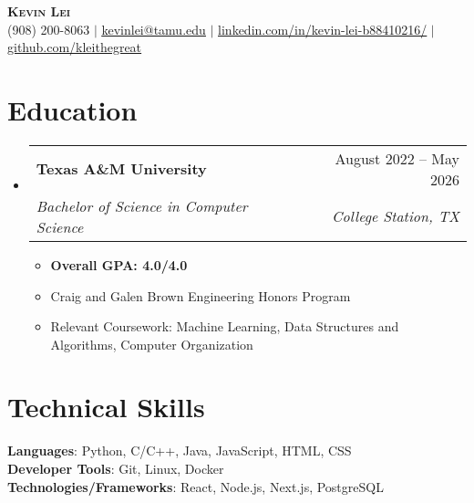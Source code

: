 \documentclass[letterpaper,11pt]{article}
\makeatletter
\newcommand{\resumeItem}[1]{
  \item\small{
    {#1 \vspace{-2pt}}
  }
}
\newcommand{\resumeSubheading}[4]{
  \vspace{-5pt}\item
    \begin{tabular*}{0.97\textwidth}[t]{l@{\extracolsep{\fill}}r}
      \textbf{#1} & #2 \\
      \textit{\small#3} & \textit{\small #4} \\
    \end{tabular*}\vspace{-5pt}
}
\newcommand{\resumeSubHeadingListStart}{\begin{itemize}[leftmargin=0.15in, label={}]}
\newcommand{\resumeSubHeadingListEnd}{\end{itemize}}
\newcommand{\resumeItemListStart}{\begin{itemize}}
\newcommand{\resumeItemListEnd}{\end{itemize}\vspace{-5pt}}
\makeatother
\begin{document}

\begin{center}
    \textbf{\Huge \scshape Kevin Lei} \\ \vspace{1pt}
    \small (908) 200-8063 $|$ \href{mailto:x@x.com}{\underline{kevinlei@tamu.edu}} $|$ 
    \href{https://linkedin.com/in/...}{\underline{linkedin.com/in/kevin-lei-b88410216/}} $|$
    \href{https://github.com/...}{\underline{github.com/kleithegreat}}
\end{center}


\section{Education}
  \resumeSubHeadingListStart
    \resumeSubheading
      {Texas A\&M University}{August 2022 -- May 2026}
      {Bachelor of Science in Computer Science}{College Station, TX}
      \resumeItemListStart
        \resumeItem{\textbf{Overall GPA: 4.0/4.0}}
        \resumeItem{Craig and Galen Brown Engineering Honors Program}
        \resumeItem{Relevant Coursework: Machine Learning, Data Structures and Algorithms, Computer Organization}
      \resumeItemListEnd
  \resumeSubHeadingListEnd

\section{Technical Skills}
\begin{itemize}[leftmargin=0.15in, label={}]
    \small{\item{
    \textbf{Languages}{: Python, C/C++, Java, JavaScript, HTML, CSS} \\
    \textbf{Developer Tools}{: Git, Linux, Docker} \\
    \textbf{Technologies/Frameworks}{: React, Node.js, Next.js, PostgreSQL} \\
    }}
\end{itemize}

\end{document}
